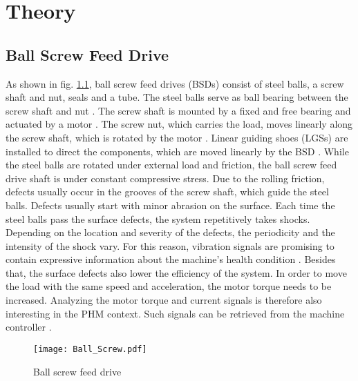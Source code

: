 \chapter{Theory}\label{chapter:theory}

\section{Ball Screw Feed Drive}
As shown in fig. \ref{fig:Ball_Screw}, ball screw feed drives (BSDs) consist of steel balls, a screw shaft and nut, seals and a tube. The steel balls serve as ball bearing between the screw shaft and nut \cite{Lee2015}. The screw shaft is mounted by a fixed and free bearing and actuated by a motor \cite{DENG2020}. The screw nut, which carries the load, moves linearly along the screw shaft, which is rotated by the motor \cite{Lee2015}. Linear guiding shoes (LGSs) are installed to direct the components, which are moved linearly by the BSD \cite{DENG2020}. While the steel balls are rotated under external load and friction, the ball screw feed drive shaft is under constant compressive stress. Due to the rolling friction, defects usually occur in the grooves of the screw shaft, which guide the steel balls. Defects usually start with minor abrasion on the surface. Each time the steel balls pass the surface defects, the system repetitively takes shocks. Depending on the location and severity of the defects, the periodicity and the intensity of the shock vary. For this reason, vibration signals are promising to contain expressive information about the machine's health condition \cite{Lee2015}. Besides that, the surface defects also lower the efficiency of the system. In order to move the load with the same speed and acceleration, the motor torque needs to be increased. Analyzing the motor torque and current signals is therefore also interesting in the PHM context. Such signals can be retrieved from the machine controller \cite{AZAMFAR2020103932}.

\begin{figure}[H]
  \centering
  \texttt{[image: Ball\_Screw.pdf]}
  \caption {Ball screw feed drive \cite{DENG2020}} \label{fig:Ball_Screw}
\end{figure}

